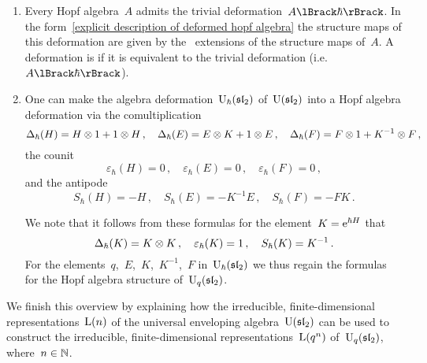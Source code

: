 \documentclass[a4paper, 11pt, oneside]{scrartcl}
\begin{document}
\begin{example}
  \leavevmode
  \begin{enumerate}
    \item
      Every Hopf algebra~$A$ admits the trivial deformation~$\power{A}{\hbar}$.
      In the form~\eqref{explicit description of deformed hopf algebra} the structure maps of this deformation are given by the~\linear{$\kfhbar$} extensions of the structure maps of~$A$.
      A deformation is  if it is equivalent to the trivial deformation (i.e.~$\power{A}{\hbar}$).
    \item
      One can make the algebra deformation~$\operatorname{U}_{\hbar}(\mathfrak{sl}_2)$ of~$\operatorname{U}(\mathfrak{sl}_2)$ into a Hopf algebra deformation via the comultiplication
      \[
        \Delta_{\hbar}(H) = H \otimes 1 + 1 \otimes H \,,
        \quad
        \Delta_{\hbar}(E) = E \otimes K + 1 \otimes E \,,
        \quad
        \Delta_{\hbar}(F) = F \otimes 1 + K^{-1} \otimes F \,,
      \]
      the counit
      \[
        \varepsilon_{\hbar}(H) = 0 \,,
        \quad
        \varepsilon_{\hbar}(E) = 0 \,,
        \quad
        \varepsilon_{\hbar}(F) = 0 \,,
      \]
      and the antipode
      \[
        S_{\hbar}(H) = - H \,,
        \quad
        S_{\hbar}(E) = - K^{-1} E \,,
        \quad
        S_{\hbar}(F) = - F K \,.
      \]

      We note that it follows from these formulas for the element~$K = \mathrm{e}^{\hbar H}$ that
      \[
        \Delta_{\hbar}(K) = K \otimes K \,,
        \quad
        \varepsilon_{\hbar}(K) = 1 \,,
        \quad
        S_{\hbar}(K) = K^{-1} \,.
      \]
      For the elements~$q$,~$E$,~$K$,~$K^{-1}$,~$F$ in~$\operatorname{U}_{\hbar}(\mathfrak{sl}_2)$ we thus regain the formulas for the Hopf algebra structure of~$\operatorname{U}_q(\mathfrak{sl}_2)$.
  \end{enumerate}
\end{example}

We finish this overview by explaining how the irreducible, finite-dimensional representations~$\operatorname{L}(n)$ of the universal enveloping algebra~$\operatorname{U}(\mathfrak{sl}_2)$ can be used to construct the irreducible, finite-dimensional representations~$\operatorname{L}(q^n)$ of~$\operatorname{U}_q(\mathfrak{sl}_2)$, where~$n \in \mathbb{N}$.
\end{document}
